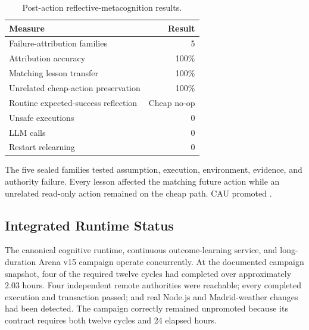 \begin{table}[htbp]
\centering
\caption{Post-action reflective-metacognition results.}
\label{tab:aion-post-action-meta}
\begin{tabular}{@{}lr@{}}
\toprule
Measure & Result \\
\midrule
Failure-attribution families & 5 \\
Attribution accuracy & 100\% \\
Matching lesson transfer & 100\% \\
Unrelated cheap-action preservation & 100\% \\
Routine expected-success reflection & Cheap no-op \\
Unsafe executions & 0 \\
LLM calls & 0 \\
Restart relearning & 0 \\
\bottomrule
\end{tabular}
\end{table}

The five sealed families tested assumption, execution, environment, evidence,
and authority failure.  Every lesson affected the matching future action while
an unrelated read-only action remained on the cheap path.  CAU promoted
.

\subsection{Integrated Runtime Status}
\label{subsec:aion-integrated-runtime-status}

The canonical cognitive runtime, continuous outcome-learning service, and
long-duration Arena v15 campaign operate concurrently.  At the documented
campaign snapshot, four of the required twelve cycles had completed over
approximately $2.03$ hours.  Four independent remote authorities were
reachable; every completed execution and transaction passed; and real Node.js
and Madrid-weather changes had been detected.  The campaign correctly remained
unpromoted because its contract requires both twelve cycles and 24 elapsed
hours.

